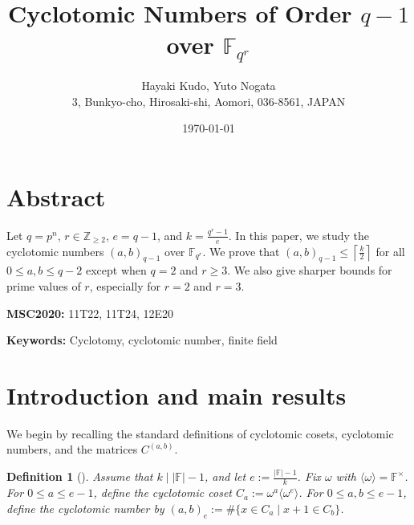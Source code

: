 \documentclass[10pt,a4paper]{article}
\title{Cyclotomic Numbers of Order $q-1$ over $\mathbb{F}_{q^r}$}
\author{Hayaki Kudo\footnotemark[1], Yuto Nogata\footnotemark[2]\\
\normalsize{3, Bunkyo-cho, Hirosaki-shi, Aomori, 036-8561, JAPAN}}
\date{\today}
\newtheorem{defi}[thm]{Definition}
\numberwithin{equation}{section}
\renewcommand{\thefootnote}{\fnsymbol{footnote}}
\begin{document}
\maketitle
{}
\setcounter{footnote}{0}
\renewcommand{\thefootnote}{\arabic{footnote}}


\section*{Abstract}
Let $q=p^n$, $r\in \mathbb{Z}_{\ge 2}$, $e=q-1$, and $k=\frac{q^r-1}{e}$. In this paper, we study the cyclotomic numbers $(a,b)_{q-1}$ over $\mathbb{F}_{q^r}$. We prove that $(a,b)_{q-1}\le \left\lceil \frac{k}{2}\right\rceil$ for all $0\le a,b\le q-2$ except when $q=2$ and $r\ge 3$. We also give sharper bounds for prime values of $r$, especially for $r=2$ and $r=3$.

\noindent\textbf{MSC2020:} 11T22, 11T24, 12E20

\noindent\textbf{Keywords:} Cyclotomy, cyclotomic number, finite field

\section{Introduction and main results}

We begin by recalling the standard definitions of cyclotomic cosets, cyclotomic numbers, and the matrices $C^{(a,b)}$.

\begin{defi}[\cite{Storer1967}]
Assume that $k\mid |\mathbb{F}|-1$, and let $e:=\frac{|\mathbb{F}|-1}{k}$. Fix $\omega$ with $\langle\omega\rangle=\mathbb{F}^{\times}$. For $0\le a\le e-1$, define the cyclotomic coset $C_a:=\omega^a\langle \omega^e\rangle$. For $0\le a,b\le e-1$, define the cyclotomic number by $(a,b)_e:=\#\{x\in C_a\mid x+1\in C_b\}$.
\end{defi}
\end{document}
